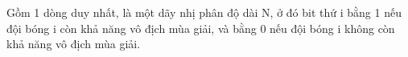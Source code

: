 Gồm 1 dòng duy nhất, là một dãy nhị phân độ dài N, ở đó bit thứ i bằng 1 nếu đội bóng i còn khả năng vô địch mùa giải, và bằng 0 nếu đội bóng i không còn khả năng vô địch mùa giải.